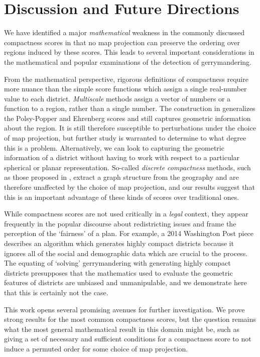\section{Discussion and Future Directions}


We have identified a major \textit{mathematical} weakness in the commonly discussed compactness scores in that no map projection can preserve the ordering over regions induced by these scores.  This leads to several important considerations in the mathematical and popular examinations of the detection of gerrymandering.

From the mathematical perspective, rigorous definitions of compactness require more nuance than the simple score functions which assign a single real-number value to each district.  \textit{Multiscale} methods assign a vector of numbers or a function to a region, rather than a single number.  The construction in \cite{deford2018tv} generalizes the Polsy-Popper and Ehrenberg scores and still captures geometric information about the region. It is still therefore susceptible to perturbations under the choice of map projection, but further study is warranted to determine to what degree this is a problem.
Alternatively, we can look to capturing the geometric information of a district without having to work with respect to a particular spherical or planar representation.  So-called \textit{discrete compactness} methods, such as those proposed in \cite{duchin2018discrete}, extract a graph structure from the geography and are therefore unaffected by the choice of map projection, and our results suggest that this is an important advantage of these kinds of scores over traditional ones.


While compactness scores are not used critically in a \textit{legal} context, they appear frequently in the popular discourse about redistricting issues and frame the perception of the `fairness' of a plan.  For example, a 2014 Washington Post piece  \cite{ingraham2014solve} describes an algorithm which generates highly compact districts because it ignores all of the social and demographic data which are crucial to the process.  The equating of `solving' gerrymandering with generating highly compact districts presupposes that the mathematics used to evaluate the geometric features of districts are unbiased and unmanipulable, and we demonstrate here that this is certainly not the case.


This work opens several promising avenues for further investigation.  We prove strong results for the most common compactness scores, but the question remains what the most general mathematical result in this domain might be, such as giving a set of necessary and sufficient conditions for a compactness score to not induce a permuted order for some choice of map projection.  